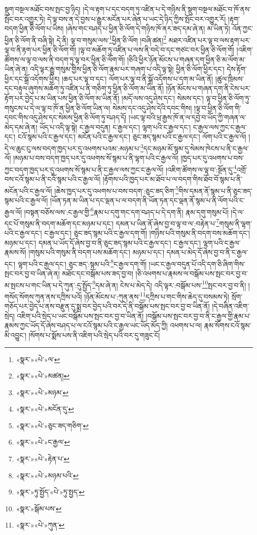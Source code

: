 སྡུག་བསྔལ་མཐོང་བས་སྤང་བྱ་ཉིད། །དེ་ལ་རྟག་པ་དང་བདག་ཏུ་འཛིན་པ་དེ་གཉིས་ནི་སྡུག་བསྔལ་མཐོང་བ་ཁོ་ནས་སྤོང་བར་འགྱུར་ཏེ། དེ་ལྟ་བས་ན་དེ་བྱས་པ་རྒྱུར་མངོན་པར་ཞེན་པ་ཡང་དེ་ཉིད་ཀྱིས་སྤོང་བར་འགྱུར་རོ། །རྟག་བདག་ཕྱིན་ཅི་ལོག་པ་ཡིས། །ཞེས་གང་བཤད་པ་ཕྱིན་ཅི་ལོག་དེ་གཉིས་ཁོ་ནར་ཟད་དམ་ཞེ་ན། མ་ཡིན་ཏེ། འོན་ཀྱང་ཕྱིན་ཅི་ལོག་ནི་བཞི་སྟེ། དེ་ནི། ལྟ་བ་གསུམ་ལས་\footnote{«སྣར་»«པེ་»ལ་}ཕྱིན་ཅི་ལོག །བཞི་ཚན།\footnote{«སྣར་»«པེ་»མཚན།} མཐར་འཛིན་པར་ལྟ་བ་ལས་རྟག་པར་ལྟ་བ་ནི་རྟག་པར་ཕྱིན་ཅི་ལོག་གོ། །ལྟ་བ་མཆོག་ཏུ་འཛིན་པ་ལས་ནི་བདེ་བ་དང་གཙང་བར་ཕྱིན་ཅི་ལོག་གོ། །འཇིག་ཚོགས་ལ་ལྟ་བ་ལས་ནི་བདག་ཏུ་ལྟ་བར་ཕྱིན་ཅི་ལོག་གོ། །ཅིའི་ཕྱིར་ཉོན་མོངས་པ་གཞན་དག་ཕྱིན་ཅི་མ་ལོག་མ་ཡིན་ཞེ་ན། འདི་ལྟར་རྒྱུ་གསུམ་གྱིས་ཕྱིན་ཅི་ལོག་རྣམ་པར་གཞག་པ་འདི་ལྟ་སྟེ། ཕྱིན་ཅི་ལོག་ཕྱིར་དང་། དེས་རྟོག་ཕྱིར་དང་སྒྲོ་འདོགས་ཕྱིར། །ཆད་པར་ལྟ་བ་དང་། ལོག་པར་ལྟ་བ་ནི་སྒྲོ་འདོགས་པ་དག་མ་ཡིན་ནོ། །ཚུལ་ཁྲིམས་དང་བརྟུལ་ཞུགས་མཆོག་ཏུ་འཛིན་པ་ནི་གཅིག་ཏུ་ཕྱིན་ཅི་ལོག་མ་ཡིན་ནོ། །ཉོན་མོངས་པ་གཞན་དག་ནི་ངེས་པར་རྟོག་པར་བྱེད་པ་མ་ཡིན་པས་ཕྱིན་ཅི་ལོག་མ་ཡིན་ནོ། །མདོ་ལས་འདུ་ཤེས་དང་། སེམས་དང་། ལྟ་བ་ཕྱིན་ཅི་ལོག་ཏུ་གསུངས་པ་དེ་ལ་ལྟ་བ་ཁོ་ན་ཕྱིན་ཅི་ལོག་ཡིན་ལ། སེམས་དང་འདུ་ཤེས་དེའི་དབང་གིས། །ལྟ་བ་ཕྱིན་ཅི་ལོག་གི་དབང་གིས་འདུ་ཤེས་དང་སེམས་ཕྱིན་ཅི་ལོག་ཏུ་བཤད་དོ། །ཡང་ལྟ་བའི་ཕྲ་རྒྱས་ཁོ་ན་ལ་དབྱེ་བ་ཡོད་ཀྱི་གཞན་ལ་མེད་དམ་ཞེ་ན། ཡོད་པ་འདི་ལྟ་སྟེ། ང་རྒྱལ་བདུན། ང་རྒྱལ་དང་། ལྷག་པའི་ང་རྒྱལ་དང་། ང་རྒྱལ་ལས་ཀྱང་ང་རྒྱལ་དང་། ངའོ་སྙམ་པའི་ང་རྒྱལ་དང་། མངོན་པའི་ང་རྒྱལ་དང་། ཅུང་ཟད་སྙམ་པའི་ང་རྒྱལ་དང་། ལོག་པའི་ང་རྒྱལ་ལོ། །དེ་ལ་ཆུང་ངུ་ལས་བདག་ཁྱད་པར་དུ་འཕགས་པའམ་:མཉམ་པ་\footnote{«སྣར་»«པེ་»མཉམ་}དང་མཉམ་མོ་སྙམ་དུ་སེམས་ཁེངས་པ་ནི་ང་རྒྱལ་ལོ། །མཉམ་པ་བས་བདག་ཁྱད་པར་དུ་འཕགས་སོ་སྙམ་པ་ནི་ལྷག་པའི་ང་རྒྱལ་ལོ། །ཁྱད་པར་དུ་འཕགས་པ་བས་ཀྱང་བདག་ཁྱད་པར་དུ་འཕགས་སོ་སྙམ་པ་ནི་ང་རྒྱལ་ལས་ཀྱང་ང་རྒྱལ་ལོ། །འཇིག་ཚོགས་ལ་ལྟ་བ་:སྔོན་དུ་\footnote{«སྣར་»«པེ་»མངོན་དུ་}འགྲོ་བས་ངའོ་སྙམ་པ་ནི་ངའོ་སྙམ་པའི་ང་རྒྱལ་ལོ། །རྟོགས་པའི་ཁྱད་པར་མ་ཐོབ་པ་ལ་བདག་གིས་ཐོབ་བོ་སྙམ་པ་ནི་མངོན་པའི་ང་རྒྱལ་ལོ། །ཆེས་ཁྱད་པར་དུ་འཕགས་པ་བས་བདག་:ཅུང་ཟད་ཅིག་\footnote{«སྣར་»«པེ་»ཅུང་ཟད་གཅིག་}གིས་དམན་ནོ་སྙམ་པ་ནི་ཅུང་ཟད་སྙམ་པའི་ང་རྒྱལ་ལོ། །ཡོན་ཏན་མ་ཡིན་པ་དང་ལྡན་པ་ལ་བདག་ནི་ཡོན་ཏན་དང་ལྡན་ནོ་སྙམ་པ་ནི་ལོག་པའི་ང་རྒྱལ་ལོ། །བསྟན་བཅོས་ལས་:ང་རྒྱལ་གྱི་\footnote{«སྣར་»«པེ་»ང་རྒྱལ་}རྣམ་པ་དགུ་གང་དག་བཤད་པ་དེ་དག་ནི། རྣམ་དགུ་གསུམ་པོ། །དེ་ལ་དང་པོ་གསུམ་ནི་བདག་མཆོག་དང་མཉམ་པ་དང་། དམན་པ་ཡིན་ནོ་ཞེས་བྱ་བ་ལྟ་བ་ལ་:བརྟེན་པ་\footnote{«སྣར་»«པེ་»རྟེན་པ་}གསུམ་ནི་ལྷག་པའི་ང་རྒྱལ་དང་། ང་རྒྱལ་དང་། ཅུང་ཟད་སྙམ་པའི་ང་རྒྱལ་དག་གོ། །གཉིས་པའི་གསུམ་ནི་བདག་བས་མཆོག་དང་། མཉམ་པ་དང་། དམན་པ་ཡོད་དོ་ཞེས་བྱ་བ་ནི་ཅུང་ཟད་སྙམ་པའི་ང་རྒྱལ་དང་། ང་རྒྱལ་དང་། ལྷག་པའི་ང་རྒྱལ་རྣམས་སོ། །གསུམ་པའི་གསུམ་ནི་བདག་པས་མཆོག་དང་། མཉམ་པ་དང་། དམན་པ་མེད་དོ་ཞེས་བྱ་བ་ནི་ང་རྒྱལ་དང་། ལྷག་པའི་ང་རྒྱལ་དང་། ཅུང་ཟད་:སྙམ་པའི་\footnote{«སྣར་»«པེ་»མཉམ་པའི་}ང་རྒྱལ་དག་གོ། །ཡང་ང་རྒྱལ་བདུན་པོ་འདི་དག་ཅི་ཞིག་གིས་སྤང་བར་བྱ་བ་ཡིན་ཞེ་ན། མཐོང་དང་བསྒོམ་པས་ཟད་བྱ་བ། །ཅི་འཕགས་པ་རྣམས་ལ་བསྒོམ་པས་སྤང་བར་བྱ་བ་མ་སྤངས་པ་གང་ཡིན་པ་དེ་ཀུན་:དུ་སྤྱོད་\footnote{«སྣར་»ཏུ་སྤྱོད་«པེ་»ཏུ་སྤྱད་}དམ་ཞེ་ན། ངེས་པ་མེད་དེ། འདི་ལྟར་:བསྒོམ་པས་\footnote{«སྣར་»སྒོམ་པས་}སྤང་བར་བྱ་བ་ནི། །གསོད་སོགས་ཀུན་ནས་དཀྲིས་པའོ། །ཉོན་མོངས་པ་:ཀུན་ནས་\footnote{«སྣར་»«པེ་»ཀུན་}དཀྲིས་པ་གང་གིས་ཆེད་དུ་བསམས་ཏེ། སྲོག་གཅོད་པར་བྱེད་པ་ནས་བརྫུན་དུ་སྨྲ་བར་བྱེད་པའི་བར་དེ་ནི་བསྒོམ་པས་སྤང་བར་བྱ་བ་ཡིན་ནོ། །དེ་བཞིན་འཇིག་སྲེད། འཇིག་པའི་སྲེད་པ་ཡང་བསྒོམ་པས་སྤང་བར་བྱ་བ་ཡིན་ནོ། །བསྒོམ་པས་སྤང་བར་བྱ་བ་ནི་ང་རྒྱལ་གྱི་རྣམ་པ་རྣམས་ཀྱང་ཡོད་དོ་ཞེས་བཤད་པ་ལ་ངའོ་སྙམ་པའི་ང་རྒྱལ་ཡང་ཡོད་མོད་ཀྱི། འཕགས་པ་ལ། རྣམ་སོགས་ངའོ་སྙམ་མི་འབྱུང་། །སོགས་པ་སྨོས་པས་ནི་འཇིག་པའི་སྲེད་པའི་བར་དུ་གཟུང་ངོ། 